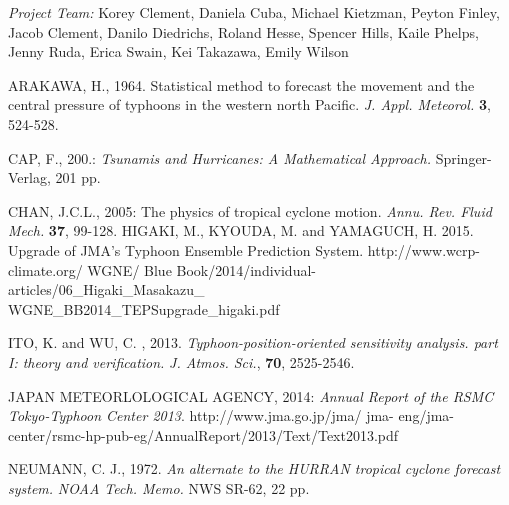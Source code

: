 \documentclass{SBCbookchapter}
\begin{document}
\emph{Project Team:} Korey Clement, Daniela Cuba, Michael Kietzman, Peyton Finley, Jacob Clement, Danilo Diedrichs, Roland Hesse, Spencer Hills, Kaile Phelps, Jenny Ruda, Erica Swain, Kei Takazawa, Emily Wilson

\newpage
 \begin{thebibliography}{9}

   {\sc  ARAKAWA, H.}, 1964. Statistical method to forecast the movement and the central pressure of typhoons in the western north Pacific. \emph{J. Appl. Meteorol.} {\bf 3}, 524-528.

        {\sc CAP, F.}, 200.: {\em Tsunamis and Hurricanes: A Mathematical Approach.} Springer-Verlag, 201 pp.

 {\sc CHAN, J.C.L.}, 2005: The physics of tropical cyclone motion. \emph{Annu. Rev. Fluid Mech.} {\bf 37}, 99-128.
  {\sc HIGAKI, M.}, {\sc KYOUDA, M.} and {\sc YAMAGUCH, H.} 2015. Upgrade of JMA's Typhoon Ensemble Prediction System. http://www.wcrp-climate.org/ WGNE/ Blue Book/2014/individual-articles/06\_Higaki\_Masakazu\_  \\WGNE\_BB2014\_TEPSupgrade\_higaki.pdf



   {\sc  ITO, K. } and  {\sc WU, C.   }, 2013. \emph{Typhoon-position-oriented sensitivity analysis. part I: theory and verification. } \emph{J. Atmos. Sci.}, {\bf 70}, 2525-2546.

     {\sc JAPAN METEORLOLOGICAL AGENCY}, 2014: \emph{Annual Report of the RSMC Tokyo-Typhoon Center 2013}. http://www.jma.go.jp/jma/ jma- eng/jma-center/rsmc-hp-pub-eg/AnnualReport/2013/Text/Text2013.pdf

 {\sc NEUMANN, C. J.}, 1972. \emph{An alternate to the HURRAN tropical cyclone forecast system.} \emph{NOAA Tech. Memo.} NWS SR-62, 22 pp.

\end{thebibliography}

%
\end{document}
